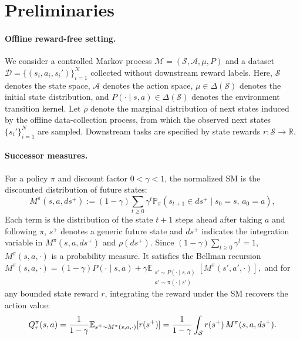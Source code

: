 \section{Preliminaries}
\label{sec:prelim}

\paragraph{Offline reward-free setting.}
We consider a controlled Markov process $\mathcal M=(\mathcal S,\mathcal A, \mu, P)$ and a dataset $\mathcal D=\{(s_i,a_i,s_i')\}_{i=1}^{N}$ collected without downstream reward labels.
Here, $\mathcal S$ denotes the state space, $\mathcal A$ denotes the action space, $\mu\in\Delta(\mathcal S)$ denotes the initial state distribution, and $P(\cdot\mid s,a)\in\Delta(\mathcal S)$ denotes the environment transition kernel.
Let $\rho$ denote the marginal distribution of next states induced by the offline data-collection process, from which the observed next states $\{s_i'\}_{i=1}^N$ are sampled.
Downstream tasks are specified by state rewards $r:\mathcal S\rightarrow\mathbb R$.

\paragraph{Successor measures.}
For a policy $\pi$ and discount factor $0<\gamma<1$, the normalized SM is the discounted distribution of future states:
\begin{equation}
    M^\pi(s,a,ds^+) :=(1-\gamma)\sum_{t\geq0}\gamma^t \mathbb P_\pi\!\left( s_{t+1}\in ds^+ \mid s_0=s,\,a_0=a \right),
    \label{eq:sm}
\end{equation}
Each term is the distribution of the state $t+1$ steps ahead after taking $a$ and following $\pi$, $s^+$ denotes a generic future state and $ds^+$ indicates the integration variable in $M^\pi(s,a,ds^+)$ and $\rho(ds^+)$.
Since $(1-\gamma)\sum_{t\geq0}\gamma^t=1$, $M^\pi(s,a,\cdot)$ is a probability measure.
It satisfies the Bellman recursion
\(
    M^\pi(s,a,\cdot) =(1-\gamma)P(\cdot\mid s,a) +\gamma\mathbb E_{\substack{ s'\sim P(\cdot\mid s,a)\\ a'\sim\pi(\cdot\mid s') }}\!\left[M^\pi(s',a',\cdot)\right],
    \label{eq:sm-bellman}
\)
and for any bounded state reward $r$, integrating the reward under the SM recovers the action value:
\begin{equation}
    Q_r^\pi(s,a) =\frac{1}{1-\gamma} \mathbb{E}_{s^+\sim M^\pi(s,a,\cdot)}[r(s^+)] =\frac{1}{1-\gamma} \int_{\mathcal S}r(s^+)\,M^\pi(s,a,ds^+).
    \label{eq:sm-value}
\end{equation}
